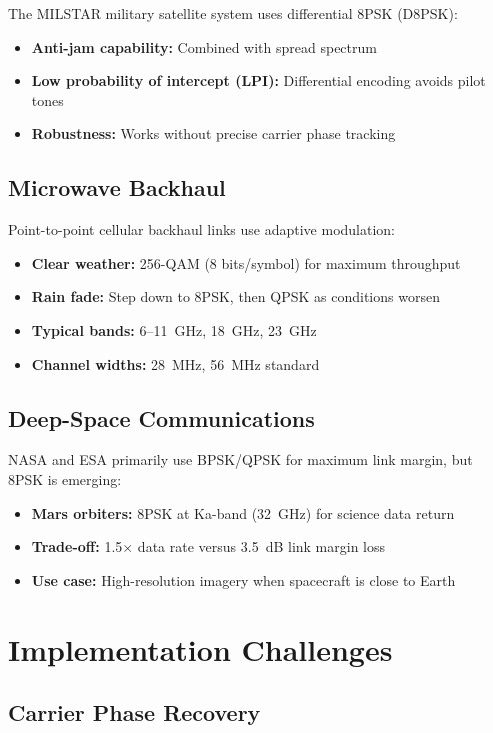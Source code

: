 The MILSTAR military satellite system uses differential 8PSK (D8PSK):
\begin{itemize}
\item \textbf{Anti-jam capability:} Combined with spread spectrum
\item \textbf{Low probability of intercept (LPI):} Differential encoding avoids pilot tones
\item \textbf{Robustness:} Works without precise carrier phase tracking
\end{itemize}

\subsection{Microwave Backhaul}

Point-to-point cellular backhaul links use adaptive modulation:
\begin{itemize}
\item \textbf{Clear weather:} 256-QAM (8 bits/symbol) for maximum throughput
\item \textbf{Rain fade:} Step down to 8PSK, then QPSK as conditions worsen
\item \textbf{Typical bands:} 6--11~GHz, 18~GHz, 23~GHz
\item \textbf{Channel widths:} 28~MHz, 56~MHz standard
\end{itemize}

\subsection{Deep-Space Communications}

NASA and ESA primarily use BPSK/QPSK for maximum link margin, but 8PSK is emerging:
\begin{itemize}
\item \textbf{Mars orbiters:} 8PSK at Ka-band (32~GHz) for science data return
\item \textbf{Trade-off:} 1.5$\times$ data rate versus 3.5~dB link margin loss
\item \textbf{Use case:} High-resolution imagery when spacecraft is close to Earth
\end{itemize}

\section{Implementation Challenges}

\subsection{Carrier Phase Recovery}

